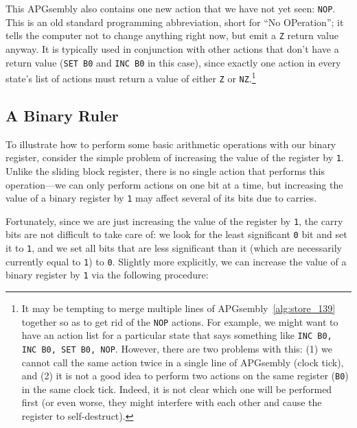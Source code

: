 This APGsembly also contains one new action that we have not yet seen: \texttt{NOP}. This is an old standard programming abbreviation, short for ``No OPeration''; it tells the computer not to change anything right now, but emit a \texttt{Z} return value anyway. It is typically used in conjunction with other actions that don't have a return value (\texttt{SET B0} and \texttt{INC B0} in this case), since exactly one action in every state's list of actions must return a value of either \texttt{Z} or \texttt{NZ}.\footnote{It may be tempting to merge multiple lines of APGsembly~\ref{alg:store_139} together so as to get rid of the \texttt{NOP} actions. For example, we might want to have an action list for a particular state that says something like \texttt{INC B0, INC B0, SET B0, NOP}. However, there are two problems with this: (1) we cannot call the same action twice in a single line of APGsembly (clock tick), and (2) it is not a good idea to perform two actions on the same register (\texttt{B0}) in the same clock tick. Indeed, it is not clear which one will be performed first (or even worse, they might interfere with each other and cause the register to self-destruct).}


\subsection{A Binary Ruler}\label{sec:binary_ruler}

To illustrate how to perform some basic arithmetic operations with our binary register, consider the simple problem of increasing the value of the register by \texttt{1}. Unlike the sliding block register, there is no single action that performs this operation---we can only perform actions on one bit at a time, but increasing the value of a binary register by \texttt{1} may affect several of its bits due to carries.

Fortunately, since we are just increasing the value of the register by \texttt{1}, the carry bits are not difficult to take care of: we look for the least significant \texttt{0} bit and set it to \texttt{1}, and we set all bits that are less significant than it (which are necessarily currently equal to \texttt{1}) to \texttt{0}. Slightly more explicitly, we can increase the value of a binary register by \texttt{1} via the following procedure:\smallskip

